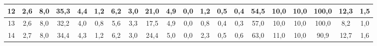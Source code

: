 \begin{sidewaystable}[]
\begin{tabular}{|c|c|c|c|c|c|c|c|c|c|c|c|c|c|c|c|c|c|c|c|}
    12 & 2,6                                              & 8,0                                              & 35,3                                             & 4,4                                              & 1,2                                              & 6,2                                              & 3,0                                              & 21,0                                             & 4,9                                              & 0,0                                              & 1,2                                              & 0,5                                              & 0,4                                              & 54,5                                            & 10,0                                            & 10,0                                            & 100,0                                           & 12,3                                            & 1,5                                             \\ \hline
    13 & 2,6                                              & 8,0                                              & 32,2                                             & 4,0                                              & 0,8                                              & 5,6                                              & 3,3                                              & 17,5                                             & 4,9                                              & 0,0                                              & 0,8                                              & 0,4                                              & 0,3                                              & 57,0                                            & 10,0                                            & 10,0                                            & 100,0                                           & 8,2                                             & 1,0                                             \\ \hline
    14 & 2,7                                              & 8,0                                              & 34,4                                             & 4,3                                              & 1,2                                              & 6,2                                              & 3,0                                              & 24,4                                             & 5,0                                              & 0,0                                              & 2,3                                              & 0,5                                              & 0,6                                              & 63,0                                            & 11,0                                            & 10,0                                            & 90,9                                            & 12,7                                            & 1,6                                             \\ \hline

\end{tabular}
\end{sidewaystable}
